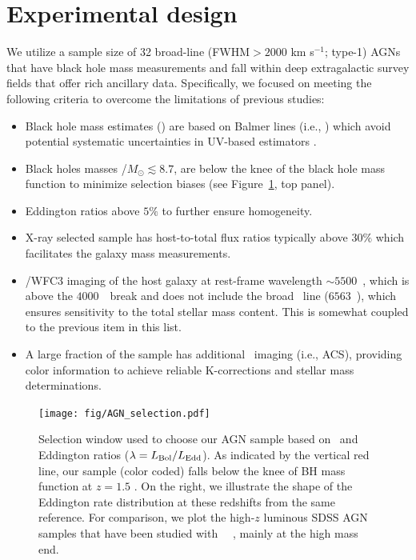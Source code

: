 \documentclass[apj]{emulateapj}
\begin{document}
\section{Experimental design}
\label{sec:data}
We utilize a sample size of 32 broad-line (FWHM$>2000$ km s$^{-1}$; type-1) AGNs that have black hole mass measurements and fall within deep extragalactic survey fields that offer rich ancillary data. Specifically, we focused on meeting the following criteria to overcome the limitations of previous studies:

\begin{itemize}

\item Black hole mass estimates (\mbh) are based on Balmer lines (i.e., \halpha) which avoid potential systematic uncertainties in UV-based estimators \citep{Greene2005}.

\item Black holes masses \mbh/$M_{\odot}\lesssim8.7$, are below the knee of the black hole mass function to minimize selection biases (see Figure~\ref{fig:selection}, top panel). %

\item Eddington ratios above $5\%$ to further ensure homogeneity.

\item X-ray selected sample has host-to-total flux ratios typically above $30\%$ which facilitates the galaxy mass measurements. %

\item \hst/WFC3 imaging of the host galaxy at rest-frame wavelength $\sim5500$~\angstrom, which is above the $4000$~\angstrom\ break and does not include the broad \halpha\ line ($6563$~\angstrom), which ensures sensitivity to the total stellar mass content. This is somewhat coupled to the previous item in this list.

\item A large fraction of the sample has additional \hst\ imaging (i.e., ACS), providing color information to achieve reliable K-corrections and stellar mass determinations. 
\end{itemize}

\begin{figure}
\centering
{
\texttt{[image: fig/AGN\_selection.pdf]}
}
\caption{\label{fig:selection} Selection window used to choose our AGN sample based on  \mbh~and Eddington ratios ($\lambda = L_{\rm Bol}/L_{\rm Edd}$). As indicated by the vertical red line, our sample (color coded) falls below the knee of BH mass function at $z=1.5$ \citep[top panel,][]{Schulze2015}. On the right, we illustrate the shape of the Eddington rate distribution at these redshifts from the same reference. For comparison, we plot the high-$z$ luminous SDSS AGN samples that have been studied with \hst\ ~\citep[grey squares and circles from][respectively]{Peng2006a, Decarli2010}, mainly at the high mass end.}
\end{figure} 
\end{document}
